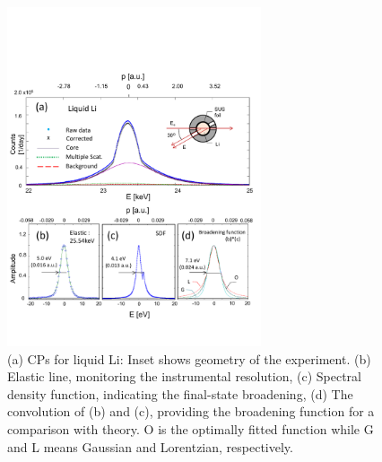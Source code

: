 \documentclass[twocolumn,showpacs,showkeys,fleqn,prl,superscriptaddress]{revtex4}%
\begin{document}
\begin{figure}
\includegraphics[bb= 30 50 500 600, width=7.5cm]{fig1.pdf}
\caption{(a) CPs for liquid Li: Inset shows geometry of the experiment. (b) Elastic line, monitoring the instrumental resolution, 
(c) Spectral density function, indicating the final-state broadening, (d) The convolution of \small{(b)} and (c), providing the broadening function for a comparison with theory. O is the optimally fitted function while G and L means Gaussian and Lorentzian, respectively.  
} 
\label{Fig.1}
\end{figure}
\end{document}
